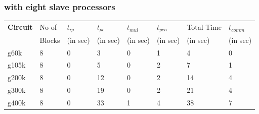 \documentclass[12pt,psfig,a4]{article}
\begin{document}
\subsubsection{with eight slave processors}
\tiny
\begin{table}[ht]
\begin{center}
\begin{tabular}{|l|l|l|l|l|l|l|l|} 
\hline
{\bf Circuit} & No of & $t_{ip}$ & $t_{pc}$ & $t_{mul}$ &  $t_{pcn}$ & Total Time & $t_{comm}$ \\ 
              & Blocks& (in sec)& (in sec)  & (in sec)  &  (in sec)  & (in sec)   & (in sec)   \\ \hline 
g60k&  \hspace{0.2in}8 & \hspace{0.2in}0 & \hspace{0.2in} 3& \hspace{0.2in}0& \hspace{0.2in}1& \hspace{0.2in} 4& \hspace{0.2in}0     \\ \hline 
g105k& \hspace{0.2in}8 & \hspace{0.2in}0 & \hspace{0.2in} 5& \hspace{0.2in}0& \hspace{0.2in}2& \hspace{0.2in} 7& \hspace{0.2in}1     \\ \hline 
g200k& \hspace{0.2in}8 & \hspace{0.2in}0 & \hspace{0.2in}12& \hspace{0.2in}0& \hspace{0.2in}2& \hspace{0.2in}14& \hspace{0.2in}4     \\ \hline 
g300k& \hspace{0.2in}8 & \hspace{0.2in}0 & \hspace{0.2in}19& \hspace{0.2in}0& \hspace{0.2in}2& \hspace{0.2in}21& \hspace{0.2in}4   \\ \hline 
g400k& \hspace{0.2in}8 & \hspace{0.2in}0 & \hspace{0.2in}33& \hspace{0.2in}1& \hspace{0.2in}4& \hspace{0.2in}38& \hspace{0.2in}7   \\ \hline 

\end{tabular}
\end{center}
\end{table}
\end{document}
